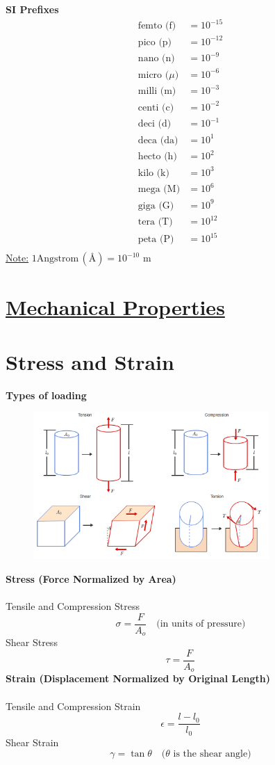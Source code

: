 \documentclass[12pt]{article}
\title{}
\date{}
\author{}
\begin{document}
\textbf{SI Prefixes}
\[\begin{aligned}
\text{femto (f)}  &= 10^{-15} \\
\text{pico (p)}   &= 10^{-12} \\
\text{nano (n)}   &= 10^{-9} \\
\text{micro ($\mu$)}  &= 10^{-6} \\
\text{milli (m)}  &= 10^{-3} \\
\text{centi (c)}  &= 10^{-2} \\
\text{deci (d)}   &= 10^{-1} \\
\text{deca (da)}  &= 10^{1} \\
\text{hecto (h)}  &= 10^{2} \\
\text{kilo (k)}   &= 10^{3} \\
\text{mega (M)}   &= 10^{6} \\
\text{giga (G)}   &= 10^{9} \\
\text{tera (T)}   &= 10^{12} \\
\text{peta (P)}   &= 10^{15} \\
\end{aligned}\]
\underline{Note:} $1\text{Angstrom}\,(\text{\AA}) = 10^{-10}$ m
\newpage
\section*{\LARGE\underline{Mechanical Properties}}
\section*{Stress and Strain}
\textbf{Types of loading}
\begin{figure}[H]
    \centering
    \includegraphics[width=0.8\textwidth]{types of loading.png}
\end{figure}
\newpage
\noindent \textbf{Stress (Force Normalized by Area)}\\\\
Tensile and Compression Stress
\[\sigma = \frac{F}{A_o} \quad \text{(in units of pressure)}\]
Shear Stress
\[\tau = \frac{F}{A_o}\]
\noindent \textbf{Strain (Displacement Normalized by Original Length)}\\\\
Tensile and Compression Strain
\[\epsilon = \frac{l - l_0}{l_0}\]
Shear Strain
\[\gamma = \tan\theta \quad \text{($\theta$ is the shear angle)}\]
\end{document}
